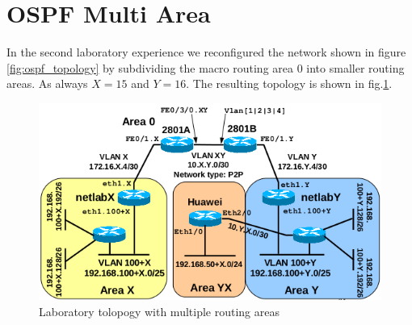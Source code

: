 \documentclass{llncs}
\newcommand{\labelsec}[1]{\label{sec:#1}}
\begin{document}

\newpage
\section{OSPF Multi Area}
\labelsec{OSPF_multi_area}
In the second laboratory experience we reconfigured the network shown in figure \ref{fig:ospf_topology} by subdividing the macro routing area 0 into smaller routing areas. As always $X=15$ and $Y=16$. The resulting topology is shown in fig.\ref{fig:ospf2_topology}.

\begin{figure}
\centering
\includegraphics[width=1.0\textwidth]{../e2/topology.png}
\caption{Laboratory tolopogy with multiple routing areas}
\label{fig:ospf2_topology}
\end{figure}
\end{document}
